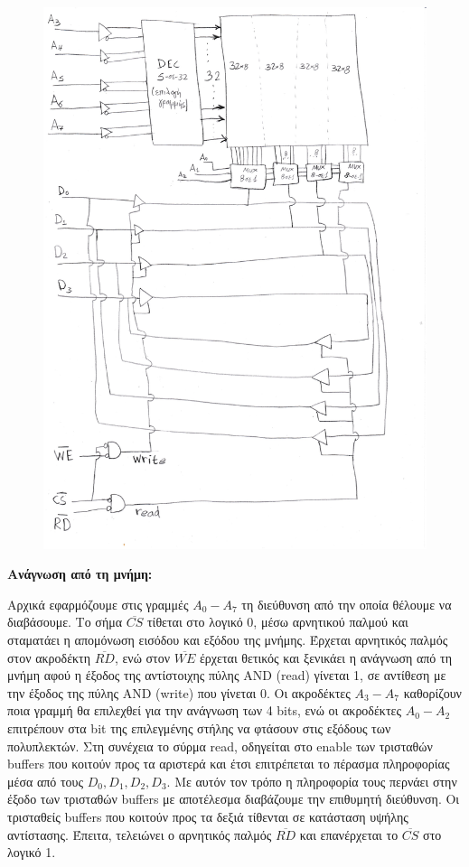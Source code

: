 \documentclass[a4paper]{article}
\begin{document}
\begin{figure}[H]
	\includegraphics[width=\textwidth]{image1.jpg}
\end{figure}

\textbf{Ανάγνωση από τη μνήμη:}

Αρχικά εφαρμόζουμε στις γραμμές $Α_0-Α_7$ τη διεύθυνση από την οποία θέλουμε να διαβάσουμε. Το σήμα $\overline{CS}$ τίθεται στο λογικό 0, μέσω αρνητικού παλμού και σταματάει η απομόνωση εισόδου και εξόδου της μνήμης. Έρχεται αρνητικός παλμός στον ακροδέκτη $\overline{RD}$, ενώ στον $\overline{WE} $ έρχεται θετικός και ξενικάει η ανάγνωση από τη μνήμη αφού η έξοδος της αντίστοιχης πύλης AND (read) γίνεται 1, σε αντίθεση με την έξοδος της πύλης AND (write) που γίνεται 0. Οι ακροδέκτες $Α_3-Α_7$ καθορίζουν ποια γραμμή θα επιλεχθεί για την ανάγνωση των 4 bits, ενώ οι ακροδέκτες $Α_0-Α_2$ επιτρέπουν στα bit της επιλεγμένης στήλης να φτάσουν στις εξόδους των πολυπλεκτών. Στη συνέχεια το σύρμα read, οδηγείται στο enable των τρισταθών buffers που κοιτούν προς τα αριστερά και έτσι επιτρέπεται το πέρασμα πληροφορίας μέσα από τους $D_0, D_1, D_2, D_3$. Με αυτόν τον τρόπο η πληροφορία τους περνάει στην έξοδο των τρισταθών buffers με αποτέλεσμα
διαβάζουμε την επιθυμητή διεύθυνση. Οι τρισταθείς buffers που κοιτούν προς τα δεξιά τίθενται σε κατάσταση υψήλης αντίστασης. Έπειτα, τελειώνει ο αρνητικός παλμός $\overline{RD}$ και επανέρχεται το $\overline{CS}$ στο λογικό 1.
\end{document}
